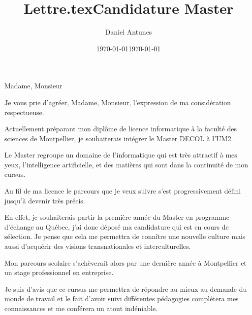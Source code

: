 \documentclass[11pt,a4paper,sans]{moderncv}
\title{Lettre.tex}
\author{Daniel Antunes }
\date{\today}
\title{Candidature Master}
\begin{document}
    \date{\today}
    \opening{Madame, Monsieur}
    \closing{Je vous prie d’agréer, Madame, Monsieur, l’expression de ma considération respectueuse.}
    \makelettertitle
    
    Actuellement préparant mon dipl\^ome de licence informatique à la faculté des sciences de Montpellier, je souhaiterais intégrer le Master DECOL à l'UM2.
    
    Le Master regroupe un domaine de l'informatique qui est très attractif à mes yeux, l'intelligence artificielle, et des matières qui sont dans la continuité de mon cursus.
    
    Au fil de ma licence le parcours que je veux suivre s'est progressivement défini jusqu'à devenir très précis.
    
    En effet, je souhaiterais partir la première année du Master en programme d'échange au Québec, j'ai donc déposé ma candidature qui est en cours de sélection. Je pense que cela me permettra de conn\^itre une nouvelle culture mais aussi d'acquérir des visions transnationales et interculturelles.
    
    Mon parcours scolaire s'achèverait alors par une dernière année à Montpellier et un stage professionnel en entreprise.
    
    Je suis d'avis que ce cursus me permettra de répondre au mieux au demande du monde de travail et le fait d'avoir suivi différentes pédagogies complétera mes connaissances et me conférera un atout indéniable.

    \makeletterclosing
\end{document}
